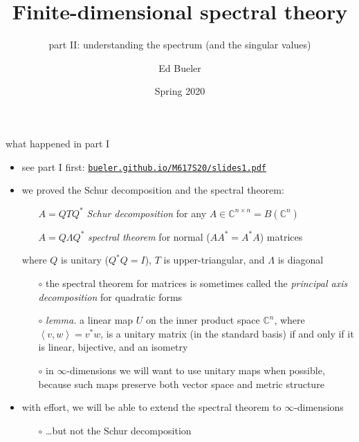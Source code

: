 \documentclass[10pt,hyperref]{beamer}
\title[Finite-dimensional spectral theory II]{Finite-dimensional spectral theory}
\subtitle{part II: understanding the spectrum (and the singular values)}
\author{Ed Bueler}
\institute[MATH 617]{MATH 617 Functional Analysis}
\date{Spring 2020}
\newcommand{\CC}{\mathbb{C}}
\newcommand{\ip}[2]{\left<#1,#2\right>}
\begin{document}
\beamertemplatenavigationsymbolsempty


\begin{frame}
  \maketitle
\end{frame}


\begin{frame}{what happened in part I}

\begin{itemize}
\item see part I first: \quad \href{http://bueler.github.io/M617S20/slides1.pdf}{\texttt{bueler.github.io/M617S20/slides1.pdf}}
\item we proved the Schur decomposition and the spectral theorem:
    \begin{itemize}
    \item[] $A = Q T Q^*$ \quad \emph{Schur decomposition} \quad for any $A \in \CC^{n\times n}=B(\CC^n)$
    \item[] $A = Q \Lambda Q^*$ \quad \emph{spectral theorem} \quad for normal ($AA^*=A^*A$) matrices
    \end{itemize}
where $Q$ is unitary ($Q^*Q=I$), $T$ is upper-triangular, and $\Lambda$ is diagonal
    \begin{itemize}
    \item[$\circ$] the spectral theorem for matrices is sometimes called the \emph{principal axis decomposition} for quadratic forms
    \item[$\circ$] \emph{lemma.} a linear map $U$ on the inner product space $\CC^n$, where $\ip{v}{w}=v^*w$, is a unitary matrix (in the standard basis) if and only if it is linear, bijective, and an isometry
    \item[$\circ$] in $\infty$-dimensions we will want to use unitary maps when possible, because such maps preserve both vector space and metric structure
    \end{itemize}
\item with effort, we will be able to extend the spectral theorem to $\infty$-dimensions
    \begin{itemize}
    \item[$\circ$] \dots but not the Schur decomposition
    \end{itemize}
\end{itemize}
\end{frame}


\end{document}
